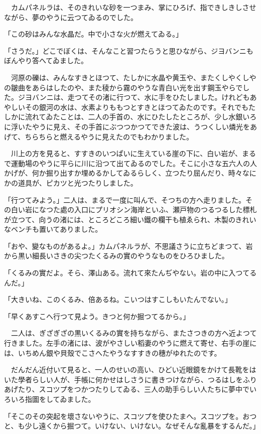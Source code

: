 \documentclass[tate,paper=b6j,jafontsize=9pt]{jlreq}
\begin{document}
　カムパネルラは、そのきれいな砂を一つまみ、掌にひろげ、指できしきしさせながら、夢のやうに云つてゐるのでした。

「この砂はみんな水晶だ。中で小さな火が燃えてゐる。」

「さうだ。」どこでぼくは、そんなこと習つたらうと思ひながら、ジヨバンニもぼんやり答へてゐました。

　河原の礫は、みんなすきとほつて、たしかに水晶や黄玉や、またくしやくしやの皺曲をあらはしたのや、また稜から霧のやうな青白い光を出す鋼玉やらでした。ジヨバンニは、走つてその渚に行つて、水に手をひたしました。けれどもあやしいその銀河の水は、水素よりももつとすきとほつてゐたのです。それでもたしかに流れてゐたことは、二人の手首の、水にひたしたところが、少し水銀いろに浮いたやうに見え、その手首にぶつつかつてできた波は、うつくしい燐光をあげて、ちらちらと燃えるやうに見えたのでもわかりました。

　川上の方を見ると、すすきのいつぱいに生えている崖の下に、白い岩が、まるで運動場のやうに平らに川に沿つて出てゐるのでした。そこに小さな五六人の人かげが、何か掘り出すか埋めるかしてゐるらしく、立つたり屈んだり、時々なにかの道具が、ピカツと光つたりしました。

「行つてみよう。」二人は、まるで一度に叫んで、そつちの方へ走りました。その白い岩になつた處の入口にプリオシン海岸といふ、瀬戸物のつるつるした標札が立つて、向うの渚には、ところどころ細い鐵の欄干も植ゑられ、木製のきれいなベンチも置いてありました。

「おや、變なものがあるよ。」カムパネルラが、不思議さうに立ちどまつて、岩から黒い細長いさきの尖つたくるみの實のやうなものをひろひました。

「くるみの實だよ。そら、澤山ある。流れて來たんぢやない。岩の中に入つてるんだ。」

「大きいね、このくるみ、倍あるね。こいつはすこしもいたんでない。」

「早くあすこへ行つて見よう。きつと何か掘つてるから。」

　二人は、ぎざぎざの黒いくるみの實を持ちながら、またさつきの方へ近よつて行きました。左手の渚には、波がやさしい稻妻のやうに燃えて寄せ、右手の崖には、いちめん銀や貝殼でこさへたやうなすすきの穗がゆれたのです。

　だんだん近付いて見ると、一人のせいの高い、ひどい近眼鏡をかけて長靴をはいた學者らしい人が、手帳に何かせはしさうに書きつけながら、つるはしをふりあげたり、スコツプをつかつたりしてゐる、三人の助手らしい人たちに夢中でいろいろ指圖をしてゐました。

「そこのその突起を壞さないやうに、スコツプを使ひたまへ。スコツプを。おつと、も少し遠くから掘つて。いけない、いけない。なぜそんな亂暴をするんだ。」
\end{document}
